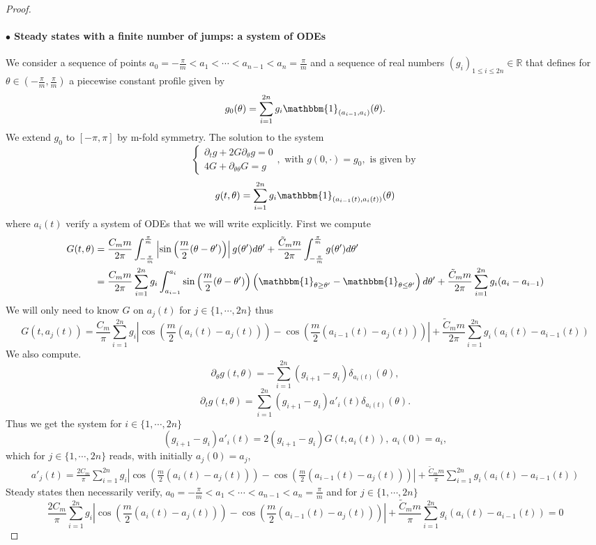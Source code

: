 \documentclass[10pt]{article}
\numberwithin{equation}{section}
\theoremstyle{plain}
\theoremstyle{definition}
\newcommand{\prt}[1]{\left( #1 \right)}
\newcommand{\abs}[1]{\left| #1 \right|}
\numberwithin{equation}{section}
\begin{document}
\begin{proof}
\paragraph{$\bullet$ Steady states with a finite number of jumps: a system of ODEs}
We consider a sequence of points $a_0=-\frac{\pi}{m}< a_1<\cdots<a_{n-1}<a_n=\frac{\pi}{m}$ and a sequence of real numbers $(g_i)_{1\leq i \leq {2n}}\in \mathbb{R}$ that defines for $\theta \in (-\frac{\pi}{m},\frac{\pi}{m})$ a piecewise constant profile given by 
\[
g_0(\theta)=\sum^{2n}_{i=1}g_i\mathbbm{1}_{(a_{i-1},a_i)}(\theta).
\]
We extend $g_0$ to $[-\pi,\pi]$ by m-fold symmetry.
The solution to the system 
\[
\begin{cases}
\partial_t g+2G\partial_\theta g=0\\
4G+\partial_{\theta \theta}G=g
\end{cases}, \text{ with } g(0,\cdot)=g_0, \text{ is given by }
\]
\[
g(t,\theta)=\sum^{2n}_{i=1}g_i\mathbbm{1}_{(a_{i-1}(t),a_i(t))}(\theta)
\]
where $a_i(t)$ verify a system of ODEs that we will write explicitly. First we compute
\begin{align*}
G(t,\theta)&=\frac{C_m m}{2\pi}\int_{-\frac{\pi}{m}}^{\frac{\pi}{m}}\left|\sin\left(\frac{m}{2}(\theta-\theta')\right)\right|g(\theta')d\theta'+\frac{\tilde{C}_m m}{2\pi}\int_{-\frac{\pi}{m}}^{\frac{\pi}{m}}g(\theta')d\theta'\\
&=\frac{C_m m}{2\pi}\sum^{2n}_{i=1}g_i\int_{a_{i-1}}^{a_i}\sin\left(\frac{m}{2}(\theta-\theta')\right)\prt{\mathbbm{1}_{\theta\geq \theta'}-\mathbbm{1}_{\theta\leq \theta'}}d\theta'+\frac{\tilde{C}_m m}{2\pi}\sum^{2n}_{i=1}g_i(a_i-a_{i-1})
\end{align*}
We will only need to know $G$ on $a_j(t)$ for $j\in \{1,\cdots,{2n}\}$ thus
\begin{equation*}
G(t,a_j(t))=\frac{C_m }{\pi}\sum^{2n}_{i=1}g_i\abs{\cos\left(\frac{m}{2}(a_{i}(t)-a_j(t))\right)-\cos\left(\frac{m}{2}(a_{i-1}(t)-a_j(t))\right)}+\frac{\tilde{C}_m m}{2\pi}\sum^{2n}_{i=1}g_i(a_i(t)-a_{i-1}(t))
\end{equation*}
We also compute.
\[
\partial_\theta g(t,\theta)=-\sum^{2n}_{i=1}(g_{i+1}-g_i)\delta_{a_{i}(t)}(\theta),
\]
\[
\partial_t g(t,\theta)=\sum^{2n}_{i=1}(g_{i+1}-g_i)a'_i(t)\delta_{a_{i}(t)}(\theta).
\]
Thus we get the system for $i\in \{1,\cdots,{2n}\}$
\[
(g_{i+1}-g_i)a'_i(t)=2(g_{i+1}-g_i)G(t,a_{i}(t)),\ a_{i}(0)=a_{i},
\]
which for $j\in \{1,\cdots,{2n}\}$ reads, with initially $a_j(0)=a_j$,
\begin{multline*}
a'_j(t)=\frac{2C_m }{\pi}\sum^{2n}_{i=1}g_i\abs{\cos\left(\frac{m}{2}(a_{i}(t)-a_j(t))\right)-\cos\left(\frac{m}{2}(a_{i-1}(t)-a_j(t))\right)}+\frac{\tilde{C}_m m}{\pi}\sum^{2n}_{i=1}g_i(a_i(t)-a_{i-1}(t))
\end{multline*}
Steady states then necessarily verify, $a_0=-\frac{\pi}{m}<a_1<\cdots<a_{n-1}<a_n=\frac{\pi}{m}$ and for $j\in \{1,\cdots,2n\}$
\begin{equation*}
\frac{2C_m }{\pi}\sum^{2n}_{i=1}g_i\abs{\cos\left(\frac{m}{2}(a_{i}(t)-a_j(t))\right)-\cos\left(\frac{m}{2}(a_{i-1}(t)-a_j(t))\right)}+\frac{\tilde{C}_m m}{\pi}\sum^{2n}_{i=1}g_i(a_i(t)-a_{i-1}(t))=0
\end{equation*}

\end{proof}
\end{document}
